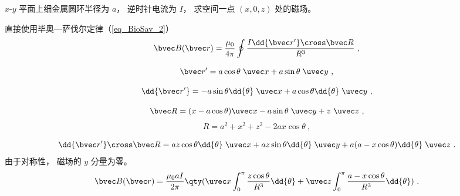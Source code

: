 
\begin{issues}
\issueDraft
\end{issues}


$x$-$y$ 平面上细金属圆环半径为 $a$， 逆时针电流为 $I$， 求空间一点 $(x, 0, z)$ 处的磁场。

直接使用毕奥—萨伐尔定律（\autoref{eq_BioSav_2}）
\begin{equation}
\bvec B(\bvec r) = \frac{\mu_0}{4\pi} \oint \frac{I \dd{\bvec r'} \cross \bvec R}{R^3}~,
\end{equation}

\begin{equation}
\bvec r' = a\cos\theta\; \uvec x + a\sin\theta\; \uvec y~,
\end{equation}

\begin{equation}
\dd{\bvec r'} = -a\sin \theta \dd{\theta}\; \uvec x + a\cos \theta \dd{\theta}\; \uvec y~,
\end{equation}

\begin{equation}
\bvec R = (x - a\cos\theta)\uvec x - a\sin\theta \;\uvec y+ z\ \uvec z~,
\end{equation}
\begin{equation}
R = a^2 + x^2 + z^2 - 2ax\cos\theta~,
\end{equation}

\begin{equation}
\dd{\bvec r'} \cross \bvec R = az \cos\theta \dd{\theta} \;\uvec x + az\sin\theta \dd{\theta} \;\uvec y + a(a - x\cos\theta)\dd{\theta}\;\uvec z~.
\end{equation}
由于对称性， 磁场的 $y$ 分量为零。
\begin{equation}
\bvec B(\bvec r) = \frac{\mu_0 a I}{2\pi} \qty(\uvec x\int_0^\pi \frac{z \cos\theta}{R^3} \dd{\theta} + \uvec z\int_0^\pi \frac{a - x\cos\theta}{R^3} \dd{\theta})~.
\end{equation}
